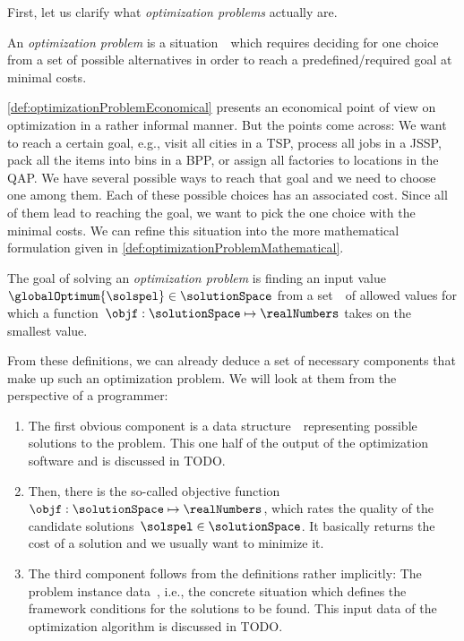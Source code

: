 First, let us clarify what \emph{optimization problems} actually are.%
%
\begin{definition}%
\label{def:optimizationProblemEconomical}%
An \emph{optimization problem} is a situation~\instance\ which requires deciding for one choice from a set of possible alternatives in order to reach a predefined/required goal at minimal costs.%
\end{definition}%
%
\autoref{def:optimizationProblemEconomical} presents an economical point of view on optimization in a rather informal manner.
But the points come across:
We want to reach a certain goal, e.g., visit all cities in a \gls{TSP}, process all jobs in a \gls{JSSP}, pack all the items into bins in a \gls{BPP}, or assign all factories to locations in the \gls{QAP}.
We have several possible ways to reach that goal and we need to choose one among them.
Each of these possible choices has an associated cost.
Since all of them lead to reaching the goal, we want to pick the one choice with the minimal costs.
We can refine this situation into the more mathematical formulation given in \autoref{def:optimizationProblemMathematical}.%
%
\begin{definition}%
\label{def:optimizationProblemMathematical}%
The goal of solving an \emph{optimization problem} is finding an input value~$\globalOptimum{\solspel}\in\solutionSpace$ from a set~\solutionSpace\ of allowed values for which a function~$\objf:\solutionSpace\mapsto\realNumbers$ takes on the smallest value.%
\end{definition}%
%
From these definitions, we can already deduce a set of necessary components that make up such an optimization problem.
We will look at them from the perspective of a programmer:%
%
\begin{enumerate}%
%
\item The first obvious component is a data structure~\solutionSpace\ representing possible solutions to the problem.
This one half of the output of the optimization software and is discussed in TODO.%
%
\item Then, there is the so-called objective function~$\objf:\solutionSpace\mapsto\realNumbers$, which rates the quality of the candidate solutions~$\solspel\in\solutionSpace$.
It basically returns the cost of a solution and we usually want to minimize it.%
%
\item The third component follows from the definitions rather implicitly:
The problem instance data~\instance, i.e., the concrete situation which defines the framework conditions for the solutions to be found.
This input data of the optimization algorithm is discussed in TODO.%
%
\end{enumerate}%
